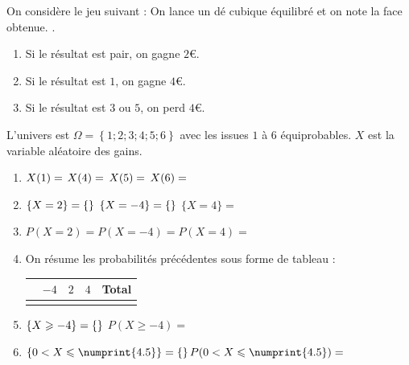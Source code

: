\documentclass[main.tex]{subfiles}
\begin{document}
\begin{example} \label{chapter07:example01}
On considère le jeu suivant : \og On lance un dé cubique équilibré et on note la face obtenue. \fg{}. 
\begin{enumerate}[label={\textbullet}, leftmargin=*] 
	\item Si le résultat est pair, on gagne $2$\euro. 
	\item Si le résultat est $1$, on gagne $4$\euro. 
	\item Si le résultat est $3$ ou $5$, on perd $4$\euro.
\end{enumerate}
L'univers est $\Omega= \left\lbrace 1; 2; 3; 4; 5; 6 \right\rbrace$ avec les issues $1$ à $6$ équiprobables. $X$  est la variable aléatoire des gains.

\vspace{-0.5em}	  
\begin{spacing}{2}
	\begin{enumerate}[label={}, leftmargin=*] 
		\item $X(1)=\dotfill$ $X(4)=\dotfill$  $X(5)=\dotfill$  $X(6)=\dotfill$ 
		\item $\{ X = 2\}=\{\dotfill  \}$ \hfill   $\{ X = -4\}=\{\dotfill  \}$ \hfill $\{ X = 4\}= $ 
		\item $P(X=2)=$\dotfill $P(X=-4)=$\dotfill $P(X=4)=$  
		\item On résume les probabilités précédentes  sous forme de tableau : \\
			\renewcommand{\arraystretch}{1.1} 
		\null	\hfill \begin{tabularx}{0.7\linewidth}{|c|Y|Y|Y|c|}
				\hline
				 & $-4$ & $2$ & $4$ & \textbf{Total}\\ \hline
				 &  &   &   & \\\hline
			\end{tabularx}  
			\hfill\null
			\smallskip
		\item $\{ X \geqslant -4\}=\{\dotfill  \}$ \hfill $P(X\geqslant -4)=$
		\item $\{0 < X \leqslant \numprint{4.5}\}=\{\dotfill  \}$\hfill $P(0 < X \leqslant \numprint{4.5})=$
	\end{enumerate}
\end{spacing}  \vspace{-0.75em}	   
 
\end{example}
 
\end{document}
